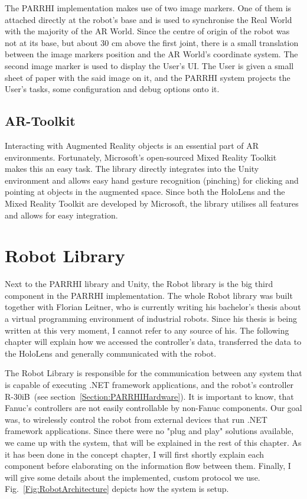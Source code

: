 The PARRHI implementation makes use of two image markers. One of them is attached directly at the robot's base and is used to synchronise the Real World with the majority of the AR World. Since the centre of origin of the robot was not at its base, but about 30 cm above the first joint, there is a small translation between the image markers position and the AR World's coordinate system. The second image marker is used to display the User's UI. The User is given a small sheet of paper with the said image on it, and the PARRHI system projects the User's tasks, some configuration and debug options onto it.


\subsection{AR-Toolkit}
Interacting with Augmented Reality objects is an essential part of AR environments. Fortunately, Microsoft's open-sourced Mixed Reality Toolkit~\cite{MicrosoftMRToolkit} makes this an easy task. The library directly integrates into the Unity environment and allows easy hand gesture recognition (pinching) for clicking and pointing at objects in the augmented space. Since both the HoloLens and the Mixed Reality Toolkit are developed by Microsoft, the library utilises all features and allows for easy integration.


\section{Robot Library}\label{Section:RobotLibrary}
Next to the PARRHI library and Unity, the Robot library is the big third component in the PARRHI implementation. The whole Robot library was built together with Florian Leitner, who is currently writing his bachelor's thesis about a virtual programming environment of industrial robots. Since his thesis is being written at this very moment, I cannot refer to any source of his. The following chapter will explain how we accessed the controller's data, transferred the data to the HoloLens and generally communicated with the robot. 

The Robot Library is responsible for the communication between any system that is capable of executing .NET framework applications, and the robot's controller R-30iB~(see section~\ref{Section:PARRHIHardware}). It is important to know, that Fanuc's controllers are not easily controllable by non-Fanuc components. Our goal was, to wirelessly control the robot from external devices that run .NET framework applications. Since there were no "plug and play" solutions available, we came up with the system, that will be explained in the rest of this chapter. As it has been done in the concept chapter, I will first shortly explain each component before elaborating on the information flow between them. Finally, I will give some details about the implemented, custom protocol we use. Fig.~\ref{Fig:RobotArchitecture} depicts how the system is setup.

